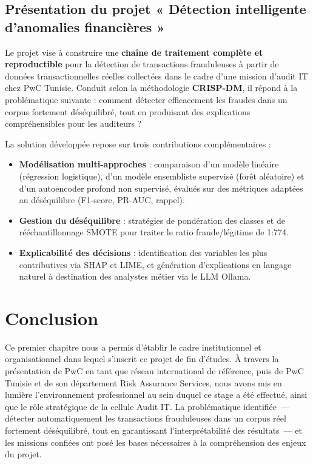 \documentclass[12pt,a4paper,twoside]{report}
\begin{document}
\subsection{Présentation du projet « Détection intelligente d'anomalies financières »}

Le projet vise à construire une \textbf{chaîne de traitement complète et reproductible} pour la détection de transactions frauduleuses à partir de données transactionnelles réelles collectées dans le cadre d'une mission d'audit IT chez PwC Tunisie. Conduit selon la méthodologie \textbf{CRISP-DM}, il répond à la problématique suivante : comment détecter efficacement les fraudes dans un corpus fortement déséquilibré, tout en produisant des explications compréhensibles pour les auditeurs ?

La solution développée repose sur trois contributions complémentaires :
\begin{itemize}
  \item \textbf{Modélisation multi-approches} : comparaison d'un modèle linéaire (régression logistique), d'un modèle ensembliste supervisé (forêt aléatoire) et d'un autoencoder profond non supervisé, évalués sur des métriques adaptées au déséquilibre (F1-score, PR-AUC, rappel).
  \item \textbf{Gestion du déséquilibre} : stratégies de pondération des classes et de rééchantillonnage SMOTE pour traiter le ratio fraude/légitime de 1:774.
  \item \textbf{Explicabilité des décisions} : identification des variables les plus contributives via SHAP et LIME, et génération d'explications en langage naturel à destination des analystes métier via le LLM Ollama.
\end{itemize}
\vspace{50pt}
\section*{Conclusion}

Ce premier chapitre nous a permis d'établir le cadre institutionnel et organisationnel dans lequel s'inscrit ce projet de fin d'études. À travers la présentation de PwC en tant que réseau international de référence, puis de PwC Tunisie et de son département Risk Assurance Services, nous avons mis en lumière l'environnement professionnel au sein duquel ce stage a été effectué, ainsi que le rôle stratégique de la cellule Audit IT. La problématique identifiée~--- détecter automatiquement les transactions frauduleuses dans un corpus réel fortement déséquilibré, tout en garantissant l'interprétabilité des résultats~--- et les missions confiées ont posé les bases nécessaires à la compréhension des enjeux du projet.
\end{document}
